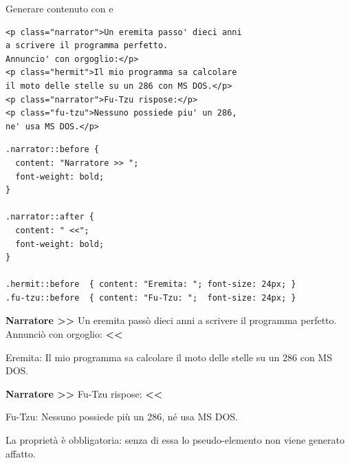 \begin{esempio}{Generare contenuto con  e }
\begin{affianco}[0.55]
\codicepiccolo
\begin{lstlisting}[style=html, name=dialogo.html]
<p class="narrator">Un eremita passo' dieci anni
a scrivere il programma perfetto.
Annuncio' con orgoglio:</p>
<p class="hermit">Il mio programma sa calcolare
il moto delle stelle su un 286 con MS DOS.</p>
<p class="narrator">Fu-Tzu rispose:</p>
<p class="fu-tzu">Nessuno possiede piu' un 286,
ne' usa MS DOS.</p>
\end{lstlisting}

\begin{lstlisting}[style=css, name=dialogo.css]
.narrator::before {
  content: "Narratore >> ";
  font-weight: bold;
}

.narrator::after {
  content: " <<";
  font-weight: bold;
}

.hermit::before  { content: "Eremita: "; font-size: 24px; }
.fu-tzu::before  { content: "Fu-Tzu: ";  font-size: 24px; }
\end{lstlisting}

\risultato
\begin{browser}
  \raggedright
  \textbf{Narratore >{}> }Un eremita passò dieci anni a scrivere il
  programma perfetto. Annunciò con orgoglio:\textbf{ <{}<}\par\vspace{6pt}
  {\large Eremita: }Il mio programma sa calcolare il moto delle stelle
  su un 286 con MS DOS.\par\vspace{6pt}
  \textbf{Narratore >{}> }Fu-Tzu rispose:\textbf{ <{}<}\par\vspace{6pt}
  {\large Fu-Tzu: }Nessuno possiede più un 286, né usa MS DOS.
\end{browser}
\end{affianco}

La proprietà  è obbligatoria: senza di essa lo pseudo-elemento non
viene generato affatto.
\end{esempio}


